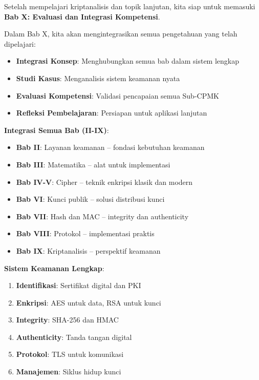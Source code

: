 \documentclass[main.tex]{subfiles}
\begin{document}

\begin{transition}
Setelah mempelajari kriptanalisis dan topik lanjutan, kita siap untuk memasuki \textbf{Bab X: Evaluasi dan Integrasi Kompetensi}.

Dalam Bab X, kita akan mengintegrasikan semua pengetahuan yang telah dipelajari:
\begin{itemize}
  \item \textbf{Integrasi Konsep}: Menghubungkan semua bab dalam sistem lengkap
  \item \textbf{Studi Kasus}: Menganalisis sistem keamanan nyata
  \item \textbf{Evaluasi Kompetensi}: Validasi pencapaian semua Sub-CPMK
  \item \textbf{Refleksi Pembelajaran}: Persiapan untuk aplikasi lanjutan
\end{itemize}

\textbf{Integrasi Semua Bab (II-IX)}:
\begin{itemize}
  \item \textbf{Bab II}: Layanan keamanan $\text{--}$ fondasi kebutuhan keamanan
  \item \textbf{Bab III}: Matematika $\text{--}$ alat untuk implementasi
  \item \textbf{Bab IV-V}: Cipher $\text{--}$ teknik enkripsi klasik dan modern
  \item \textbf{Bab VI}: Kunci publik $\text{--}$ solusi distribusi kunci
  \item \textbf{Bab VII}: Hash dan MAC $\text{--}$ integrity dan authenticity
  \item \textbf{Bab VIII}: Protokol $\text{--}$ implementasi praktis
  \item \textbf{Bab IX}: Kriptanalisis $\text{--}$ perspektif keamanan
\end{itemize}

\textbf{Sistem Keamanan Lengkap}:
\begin{enumerate}
  \item \textbf{Identifikasi}: Sertifikat digital dan PKI
  \item \textbf{Enkripsi}: AES untuk data, RSA untuk kunci
  \item \textbf{Integrity}: SHA-256 dan HMAC
  \item \textbf{Authenticity}: Tanda tangan digital
  \item \textbf{Protokol}: TLS untuk komunikasi
  \item \textbf{Manajemen}: Siklus hidup kunci
\end{enumerate}


\end{transition}
\end{document}
